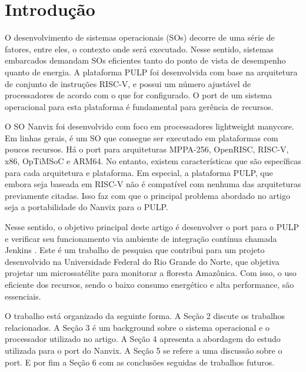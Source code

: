 \section{Introdução}

O desenvolvimento de sistemas operacionais (SOs) decorre de uma série de fatores, entre eles, o contexto onde será executado. Nesse sentido, sistemas
embarcados demandam SOs eficientes tanto do ponto de vista de desempenho quanto de energia. A plataforma PULP foi desenvolvida com base na arquitetura 
de conjunto de instruções RISC-V, e possui um número ajustável de processadores de acordo com o que for configurado. O port de um sistema operacional 
para esta plataforma é fundamental para gerência de recursos.

O SO Nanvix foi desenvolvido com foco em processadores lightweight manycore. Em linhas gerais, é um SO que consegue ser executado em plataformas com poucos
recursos. Há o port para arquiteturas MPPA-256, OpenRISC, RISC-V, x86, OpTiMSoC e ARM64. No entanto, existem características que são específicas para cada 
arquitetura e plataforma. Em especial, a plataforma PULP, que embora seja baseada em RISC-V não é compatível com nenhuma das arquiteturas previamente citadas. 
Isso faz com que o principal problema abordado no artigo seja a portabilidade do Nanvix para o PULP.

Nesse sentido, o objetivo principal deste artigo é desenvolver o port para o PULP e verificar seu funcionamento via ambiente de integração contínua chamada
Jenkins \cite{JenkinsServer}. Este é um trabalho de pesquisa que contribui para um projeto desenvolvido na Universidade Federal do Rio Grande do Norte, que objetiva projetar
 um microssatélite para monitorar a floresta Amazônica. Com isso, o uso eficiente dos recursos, sendo o baixo consumo energético e alta performance, são essenciais.

O trabalho está organizado da seguinte forma. A Seção 2 discute os trabalhos relacionados. A Seção 3 é um background sobre o sistema operacional e o 
processador utilizado no artigo. A Seção 4 apresenta a abordagem do estudo utilizada para o port do Nanvix. A Seção 5 se refere a uma discussão sobre 
o port. E por fim a Seção 6 com as conclusões seguidas de trabalhos futuros.